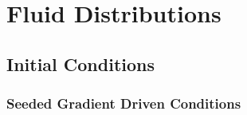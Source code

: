 \chapter{Fluid Distributions}

\section{Initial Conditions}

\subsection{Seeded Gradient Driven Conditions}


